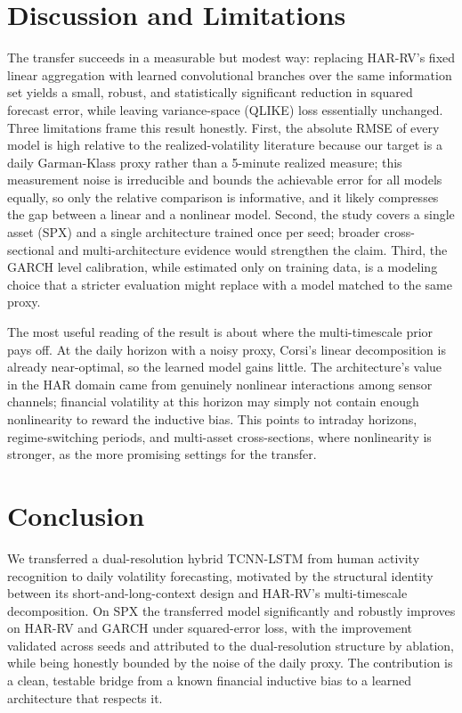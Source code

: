 \documentclass[11pt]{article}
\begin{document}
\section{Discussion and Limitations}
\label{sec:disc}
The transfer succeeds in a measurable but modest way: replacing HAR-RV's fixed linear aggregation with
learned convolutional branches over the same information set yields a small, robust, and statistically
significant reduction in squared forecast error, while leaving variance-space (QLIKE) loss essentially
unchanged. Three limitations frame this result honestly. First, the absolute RMSE of every model is high
relative to the realized-volatility literature because our target is a daily Garman-Klass proxy rather
than a 5-minute realized measure; this measurement noise is irreducible and bounds the achievable error
for all models equally, so only the relative comparison is informative, and it likely compresses the gap
between a linear and a nonlinear model. Second, the study covers a single asset (SPX) and a single
architecture trained once per seed; broader cross-sectional and multi-architecture evidence would
strengthen the claim. Third, the GARCH level calibration, while estimated only on training data, is a
modeling choice that a stricter evaluation might replace with a model matched to the same proxy.

The most useful reading of the result is about where the multi-timescale prior pays off. At the daily
horizon with a noisy proxy, Corsi's linear decomposition is already near-optimal, so the learned model
gains little. The architecture's value in the HAR domain came from genuinely nonlinear interactions
among sensor channels; financial volatility at this horizon may simply not contain enough nonlinearity to
reward the inductive bias. This points to intraday horizons, regime-switching periods, and multi-asset
cross-sections, where nonlinearity is stronger, as the more promising settings for the transfer.

\section{Conclusion}
We transferred a dual-resolution hybrid TCNN-LSTM from human activity recognition to daily volatility
forecasting, motivated by the structural identity between its short-and-long-context design and HAR-RV's
multi-timescale decomposition. On SPX the transferred model significantly and robustly improves on HAR-RV
and GARCH under squared-error loss, with the improvement validated across seeds and attributed to the
dual-resolution structure by ablation, while being honestly bounded by the noise of the daily proxy. The
contribution is a clean, testable bridge from a known financial inductive bias to a learned architecture
that respects it.
\end{document}
